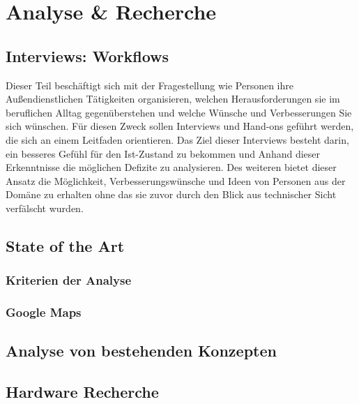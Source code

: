 \documentclass[../Bachelorarbeit.tex]{subfiles}
\begin{document}
\chapter{Analyse \& Recherche}
\label{chap:analyse}

\section{Interviews: Workflows}
\label{chap:analyse:sec:interviews}
Dieser Teil beschäftigt sich mit der Fragestellung wie Personen ihre Außendienstlichen Tätigkeiten organisieren, welchen Herausforderungen sie im beruflichen Alltag gegenüberstehen und welche Wünsche und Verbesserungen Sie sich wünschen. 
Für diesen Zweck sollen Interviews und Hand-ons  geführt werden, die sich an einem Leitfaden orientieren. 
Das Ziel dieser Interviews besteht darin, ein besseres Gefühl für den Ist-Zustand zu bekommen und Anhand dieser Erkenntnisse die möglichen Defizite zu analysieren.
Des weiteren bietet dieser Ansatz die Möglichkeit, Verbesserungswünsche und Ideen von Personen aus der Domäne zu erhalten ohne das sie zuvor durch den Blick aus technischer Sicht verfälscht wurden.

\section{State of the Art}
\label{chap:analyse:sec:sota}


\subsection{Kriterien der Analyse}
\label{chap:analyse:sec:sota:sec:kriterien_der_analyse}


\subsection{Google Maps}
\label{chap:analyse:sec:sota:sec:google_maps}

\section{Analyse von bestehenden Konzepten}
\label{chap:analyse:sec:analyBestehendeKonz}

\section{Hardware Recherche}
\label{chap:analyse:sec:hw_recherce}

\end{document}
